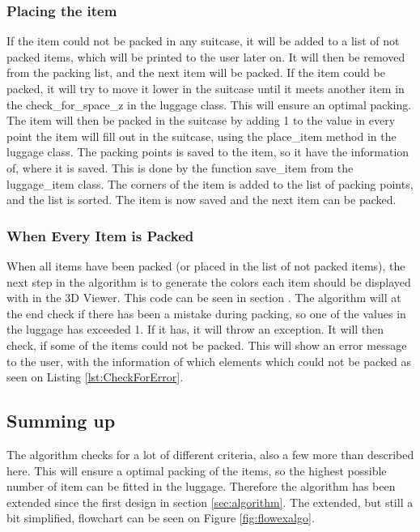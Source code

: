 \subsubsection{Placing the item}
If the item could not be packed in any suitcase, it will be added to a list of not packed items, which will be printed to the user later on. It will then be removed from the packing list, and the next item will be packed. If the item could be packed, it will try to move it lower in the suitcase until it meets another item in the check\_for\_space\_z in the luggage class. This will ensure an optimal packing. The item will then be packed in the suitcase by adding 1 to the value in every point the item will fill out in the suitcase, using the place\_item method in the luggage class. The packing points is saved to the item, so it have the information of, where it is saved. This is done by the function save\_item from the luggage\_item class. The corners of the item is added to the list of packing points, and the list is sorted. The item is now saved and the next item can be packed.
\subsubsection{When Every Item is Packed}
When all items have been packed (or placed in the list of not packed items), the next step in the algorithm is to generate the colors each item should be displayed with in the 3D Viewer. This code can be seen in section .
The algorithm will at the end check if there has been a mistake during packing, so one of the values in the luggage has exceeded 1. If it has, it will throw an exception. It will then check, if some of the items could not be packed. This will show an error message to the user, with the information of which elements which could not be packed as seen on Listing \ref{lst:CheckForError}.

\subsection{Summing up}
The algorithm checks for a lot of different criteria, also a few more than described here. This will ensure a optimal packing of the items, so the highest possible number of item can be fitted in the luggage. Therefore the algorithm has been extended since the first design in section \ref{sec:algorithm}. The extended, but still a bit simplified, flowchart can be seen on Figure \ref{fig:flowexalgo}.

